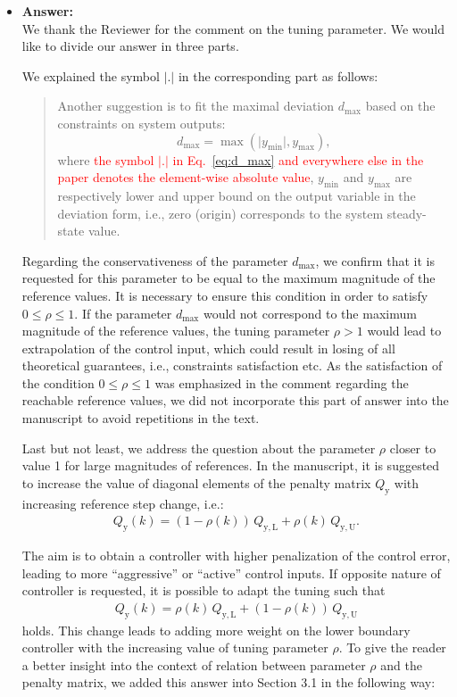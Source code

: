 \documentclass[a4paper,10pt]{article}
\newcommand{\change}[1]{\textcolor{red}{#1}}
\newcommand{\answer}[1]{
	\begin{itemize}
		\item[] \textbf{Answer:}\\ #1
	\end{itemize}
}
\begin{document}
	\answer{
		We thank the Reviewer for the comment on the tuning parameter. We would like to divide our answer in three parts.
		
		We explained the symbol $\lvert.\rvert$ in the corresponding part as follows:
		
		\begin{quote}
			Another suggestion is to fit the maximal deviation $d_{\max}$ based on the constraints on system outputs: 
			\begin{equation} \tag{6}
				\label{eq:d_max}
				d_{\max} = \max(\vert y_{\min} \vert, y_{\max}),
			\end{equation}
			where \change{the symbol $\lvert.\rvert$ in Eq.~\eqref{eq:d_max} and everywhere else in the paper denotes the element-wise absolute value}, $y_{\min}$ and $y_{\max}$ are respectively lower and upper bound on the output variable in the deviation form, i.e., zero (origin) corresponds to the system steady-state value. 
		\end{quote}
	
		Regarding the conservativeness of the parameter $d_{\max}$, we confirm that it is requested for this parameter to be equal to the maximum magnitude of the reference values. It is necessary to ensure this condition in order to satisfy $0 \le \rho \le 1$. If the parameter $d_{\max}$ would not correspond to the maximum magnitude of the reference values, the tuning parameter $\rho > 1$ would lead to extrapolation of the control input, which could result in losing of all theoretical guarantees, i.e., constraints satisfaction etc. As the satisfaction of the condition $0 \le \rho \le 1$ was emphasized in the comment regarding the reachable reference values, we did not incorporate this part of answer into the manuscript to avoid repetitions in the text.
		
		Last but not least, we address the question about the parameter $\rho$ closer to value 1 for large magnitudes of references. 			
		In the manuscript, it is suggested to increase the value of diagonal elements of the penalty matrix $Q_\mathrm{y}$ with increasing reference step change, i.e.:		
		\begin{eqnarray*}
			Q_\mathrm{y}(k) = (1-\rho(k)) \, Q_\mathrm{y,L} + \rho(k) \, Q_\mathrm{y,U}.
		\end{eqnarray*}
			
		The aim is to obtain a controller with higher penalization of the control error, leading to more ``aggressive'' or ``active'' control inputs.
		If opposite nature of controller is requested, it is possible to adapt the tuning such that 
		\begin{eqnarray*}
			Q_\mathrm{y}(k) = \rho(k) \, Q_\mathrm{y,L} + (1-\rho(k)) \, Q_\mathrm{y,U}
		\end{eqnarray*}
		holds. This change leads to adding more weight on the lower boundary controller with the increasing value of tuning parameter $\rho$. To give the reader a better insight into the context of relation between parameter $\rho$ and the penalty matrix, we added this answer into Section 3.1 in the following way:
				
}
\end{document}
